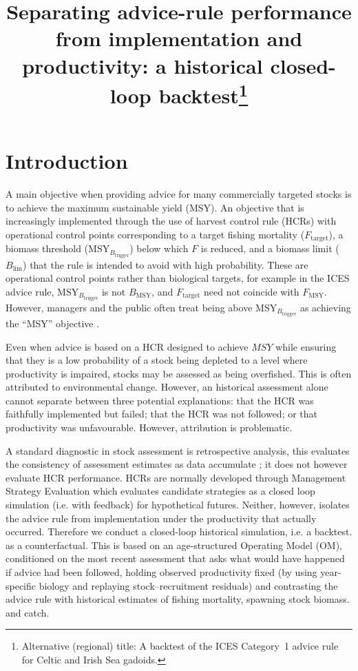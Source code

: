 \documentclass[11pt,a4paper]{article}
\title{Separating advice-rule performance from implementation and
productivity: a historical closed-loop backtest\thanks{Alternative
(regional) title: A backtest of the ICES Category~1 advice rule for
Celtic and Irish Sea gadoids.}}
\author{}
\date{}
\newcommand{\Fmsy}{F_{\mathrm{MSY}}}
\newcommand{\Blim}{B_{\lim}}
\newcommand{\Btrig}{\mathrm{MSY}_{B_{\mathrm{trigger}}}}
\newcommand{\Bmsy}{B_{\mathrm{MSY}}}
\newcommand{\Ftar}{F_{\mathrm{target}}}
\begin{document}
\maketitle



\section{Introduction}
\label{sec:intro}

A main objective when providing advice for many commercially targeted stocks
is to achieve the maximum sustainable yield (MSY). An objective that is increasingly implemented through the use of harvest control rule (HCRs) with operational control points corresponding to a target fishing mortality ($\Ftar$), a biomass threshold ($\Btrig$) below which $F$ is reduced, and a biomass limit ($\Blim$) that the rule is intended to avoid with high probability. These are operational control points rather than biological targets, for example in the ICES advice rule, $\Btrig$ is not $\Bmsy$, and $\Ftar$ need not coincide with $\Fmsy$. However, managers and the public often treat being above $\Btrig$ as achieving the ``MSY'' objective \citep{winker2026rebuilding}.

Even when advice is based on a HCR designed to achieve $MSY$ while ensuring that they is a low probability of a stock being depleted to a level where productivity is impaired, stocks may be assessed as being overfished. This is often attributed to environmental change. However, an historical assessment alone
cannot separate between three potential explanations: that the HCR was faithfully
implemented but failed; that the HCR was not followed; or that productivity was
unfavourable. However, attribution is problematic.

A standard diagnostic in stock assessment is retrospective analysis, this evaluates the consistency of assessment estimates as data accumulate \citep{mohn1999}; it does not however evaluate HCR performance. HCRs are normally developed through Management Strategy Evaluation \citep[MSE][]{punt2016msebestpractice} which evaluates candidate strategies as a closed loop simulation (i.e. with feedback) for hypothetical futures. Neither, however, isolates the advice rule from implementation under the productivity that actually occurred. Therefore  we conduct a closed-loop historical simulation, i.e. a backtest. as a counterfactual. This is based on an age-structured Operating Model (OM), conditioned on the most recent assessment that asks what would have happened if advice had been followed, holding observed productivity fixed (by using year-specific biology and replaying stock--recruitment residuals) and contrasting the advice rule with historical estimates of fishing mortality, spawning stock biomass. and catch.
\end{document}
